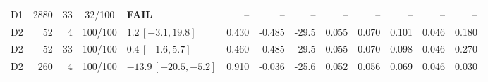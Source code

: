 \documentclass[10pt,a4paper]{article}
\begin{document}
\begin{longtable}{crrcp{33mm}rrrrrrrr}
D1 & 2880 & 33 & 32/100 & \textbf{FAIL} & -- & -- & -- & -- & -- & -- & -- & --\\
D2 & 52 & 4 & 100/100 & \(1.2\,[-3.1,19.8]\) & 0.430 & -0.485 & -29.5 & 0.055 & 0.070 & 0.101 & 0.046 & 0.180\\
D2 & 52 & 33 & 100/100 & \(0.4\,[-1.6,5.7]\) & 0.460 & -0.485 & -29.5 & 0.055 & 0.070 & 0.098 & 0.046 & 0.270\\
D2 & 260 & 4 & 100/100 & \(-13.9\,[-20.5,-5.2]\) & 0.910 & -0.036 & -25.6 & 0.052 & 0.056 & 0.069 & 0.046 & 0.030\\

\end{longtable}
\end{document}
